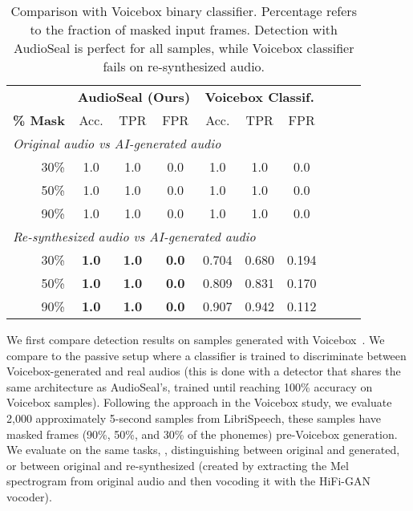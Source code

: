 \begin{table}[t!]
    \centering
    \caption{
        Comparison with Voicebox binary classifier. 
        Percentage refers to the fraction of masked input frames.
        Detection with AudioSeal is perfect for all samples, while Voicebox classifier fails on re-synthesized audio.
    }
    \label{chap4/tab:voicebox}
    \footnotesize
        \begin{tabular}{r *{3}{c}  *{3}{c}  *{3}{c} }
            \toprule
            & \multicolumn{3}{c}{\textbf{AudioSeal (Ours)}} & \multicolumn{3}{c}{\textbf{Voicebox Classif.}} \\
            \cmidrule(rr){2-4} \cmidrule(rr){5-7}
            \textbf{\% Mask} & Acc. & TPR & FPR & Acc. & TPR & FPR \\
            \midrule
            \multicolumn{7}{l}{\emph{Original audio vs AI-generated audio}} \\
            30\% & 1.0 & 1.0 & 0.0 & 1.0 & 1.0 & 0.0 \\
            50\% & 1.0 & 1.0 & 0.0 & 1.0 & 1.0 & 0.0 \\
            90\% & 1.0 & 1.0 & 0.0 & 1.0 & 1.0 & 0.0 \\
            \midrule
            \multicolumn{7}{l}{\emph{Re-synthesized audio vs AI-generated audio}} \\
            30\% & \textbf{1.0} & \textbf{1.0} & \textbf{0.0} & 0.704 & 0.680 & 0.194 \\
            50\% & \textbf{1.0} & \textbf{1.0} & \textbf{0.0} & 0.809 & 0.831 & 0.170 \\
            90\% & \textbf{1.0} & \textbf{1.0} & \textbf{0.0} & 0.907 & 0.942 & 0.112 \\
            \bottomrule
        \end{tabular}
\end{table}



We first compare detection results on samples generated with Voicebox~\citep{le2023voicebox}.
We compare to the passive setup where a classifier is trained to discriminate between Voicebox-generated and real audios (this is done with a detector that shares the same architecture as AudioSeal's, trained until reaching 100\% accuracy on Voicebox samples).
Following the approach in the Voicebox study, we evaluate 2,000 approximately 5-second samples from LibriSpeech, these samples have masked frames (90\%, 50\%, and 30\% of the phonemes) pre-Voicebox generation.
We evaluate on the same tasks, \ie, distinguishing between original and generated, or between original and re-synthesized (created by extracting the Mel spectrogram from original audio and then vocoding it with the HiFi-GAN vocoder).

